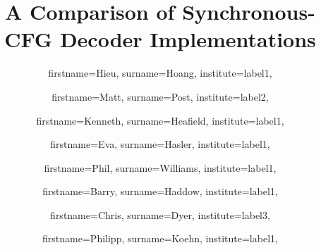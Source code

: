 \documentclass{pbml}
\begin{document}

\title{A Comparison of Synchronous-CFG \titlelinebreak{} Decoder Implementations}




\author{
  firstname=Hieu,
  surname=Hoang,
  institute=label1,
}
\author{
  firstname=Matt,
  surname=Post,
  institute=label2,
}
\author{
  firstname=Kenneth,
  surname=Heafield,
  institute=label1,
}
\author{
  firstname=Eva,
  surname=Hasler,
  institute=label1,
}
\author{
  firstname=Phil,
  surname=Williams,
  institute=label1,
}
\author{
  firstname=Barry,
  surname=Haddow,
  institute=label1,
}
\author{
  firstname=Chris,
  surname=Dyer,
  institute=label3,
}
\author{
  firstname=Philipp,
  surname=Koehn,
  institute=label1,
}

\end{document}
